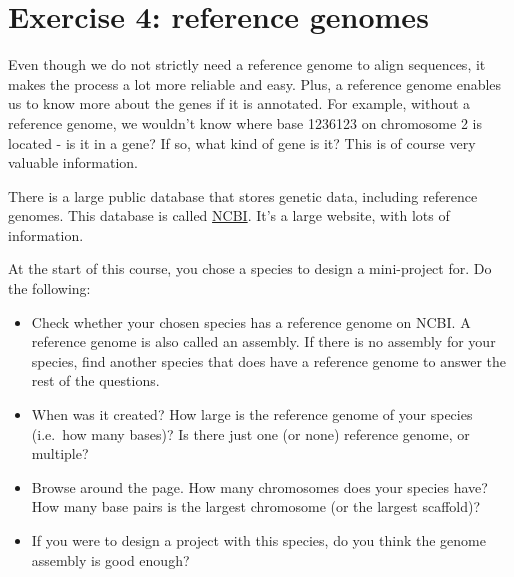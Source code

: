 \documentclass[
  letterpaper,
  DIV=11,
  numbers=noendperiod]{scrreprt}
\providecommand{\tightlist}{%
  \setlength{\itemsep}{0pt}\setlength{\parskip}{0pt}}\usepackage{longtable,booktabs,array}
\begin{document}
\section{Exercise 4: reference
genomes}\label{exercise-4-reference-genomes}

Even though we do not strictly need a reference genome to align
sequences, it makes the process a lot more reliable and easy. Plus, a
reference genome enables us to know more about the genes if it is
annotated. For example, without a reference genome, we wouldn't know
where base 1236123 on chromosome 2 is located - is it in a gene? If so,
what kind of gene is it? This is of course very valuable information.

There is a large public database that stores genetic data, including
reference genomes. This database is called
\href{http://ncbi.nlm.nih.gov/}{NCBI}. It's a large website, with lots
of information.

At the start of this course, you chose a species to design a
mini-project for. Do the following:

\begin{itemize}
\tightlist
\item
  Check whether your chosen species has a reference genome on NCBI. A
  reference genome is also called an assembly. If there is no assembly
  for your species, find another species that does have a reference
  genome to answer the rest of the questions.
\item
  When was it created? How large is the reference genome of your species
  (i.e.~how many bases)? Is there just one (or none) reference genome,
  or multiple?
\item
  Browse around the page. How many chromosomes does your species have?
  How many base pairs is the largest chromosome (or the largest
  scaffold)?
\item
  If you were to design a project with this species, do you think the
  genome assembly is good enough?
\end{itemize}
\end{document}
